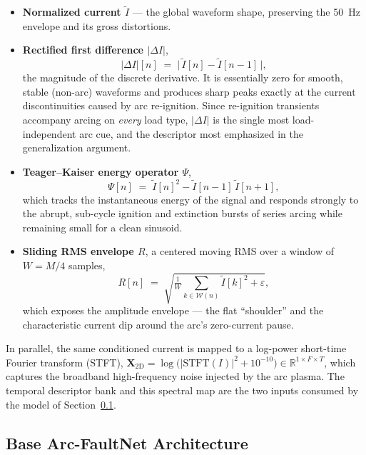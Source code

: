 \documentclass[journal,article,submit,moreauthors]{Definitions/mdpi}
\begin{document}
\begin{itemize}
\item \textbf{Normalized current $\tilde{I}$} --- the global waveform shape, preserving the 50~Hz envelope and its gross distortions.
\item \textbf{Rectified first difference $|\Delta I|$},
\begin{equation}
|\Delta I|[n] \;=\; \big|\,\tilde{I}[n]-\tilde{I}[n-1]\,\big|,
\label{eq:absdi}
\end{equation}
the magnitude of the discrete derivative. It is essentially zero for smooth, stable (non-arc) waveforms and produces sharp peaks exactly at the current discontinuities caused by arc re-ignition. Since re-ignition transients accompany arcing on \emph{every} load type, $|\Delta I|$ is the single most load-independent arc cue, and the descriptor most emphasized in the generalization argument.
\item \textbf{Teager--Kaiser energy operator $\Psi$},
\begin{equation}
\Psi[n] \;=\; \tilde{I}[n]^{2} - \tilde{I}[n-1]\,\tilde{I}[n+1],
\label{eq:tkeo}
\end{equation}
which tracks the instantaneous energy of the signal and responds strongly to the abrupt, sub-cycle ignition and extinction bursts of series arcing while remaining small for a clean sinusoid.
\item \textbf{Sliding RMS envelope $R$}, a centered moving RMS over a window of $W=M/4$ samples,
\begin{equation}
R[n] \;=\; \sqrt{\tfrac{1}{W}\!\sum_{k\in\mathcal{W}(n)}\!\tilde{I}[k]^{2} + \varepsilon},
\label{eq:rmsslide}
\end{equation}
which exposes the amplitude envelope --- the flat ``shoulder'' and the characteristic current dip around the arc's zero-current pause.
\end{itemize}

In parallel, the same conditioned current is mapped to a log-power short-time Fourier transform (STFT), $\mathbf{X}_{2\mathrm{D}} = \log\!\big(|\mathrm{STFT}(I)|^{2}+10^{-10}\big) \in \mathbb{R}^{1\times F\times T}$, which captures the broadband high-frequency noise injected by the arc plasma. The temporal descriptor bank and this spectral map are the two inputs consumed by the model of Section~\ref{sec:architecture}.

\subsection{Base Arc-FaultNet Architecture}
\label{sec:architecture}
\end{document}
